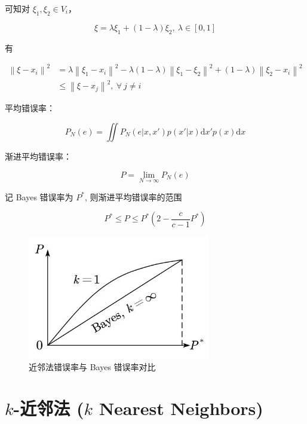 \documentclass[openany,a4paper,12pt]{ctexbook}
\theoremstyle{kaiti}
\theoremstyle{normal}
\begin{document}
可知对 $\xi_1,\xi_2\in V_i$，

\begin{equation}
\xi =\lambda \xi_1+\left(1-\lambda \right)\xi_2,~\lambda \in \left[0,1 \right]
\end{equation}

有

\begin{equation}
\begin{aligned}
  \left\| \xi -x_i \right\|^2
  &=\lambda \left\| \xi_1-x_i \right\|^2-\lambda \left(1-\lambda \right)\left\| \xi_1-\xi_2 \right\|^2 +\left(1-\lambda \right)\left\| \xi_2-x_i \right\|^2\\
  &\leqslant \left\| \xi -x_j \right\|^2,~\forall~j\ne i
\end{aligned}
\end{equation}

平均错误率：

\begin{equation}
P_N\left(e \right)=\iint{P_N\left(e|x,x' \right)p\left(x'|x \right)\mathrm{d}x'p(x)\mathrm{d}x}
\end{equation}

渐进平均错误率：

\begin{equation}
P=\lim_{N\rightarrow \infty} P_N\left(e \right)
\end{equation}

记 Bayes 错误率为 $P^*$, 则渐进平均错误率的范围

\begin{equation}
P^*\leqslant P\leqslant P^*\left(2-\frac{c}{c-1}P^*\right)
\end{equation}

\begin{figure}
  \centering
  \includegraphics[width=8cm]{1627808484207-6.1-2.jpg}
  \caption{近邻法错误率与 Bayes 错误率对比}
\end{figure}

\section{\texorpdfstring{$k$}{k}-近邻法 (\texorpdfstring{$k$}{k} Nearest Neighbors)}
\end{document}
